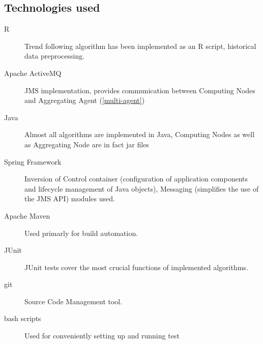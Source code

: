 \subsection{Technologies used}

\begin{description}
  \item [R]
      Trend following algorithm has been implemented as an R script, historical data preprocessing.
  \item [Apache ActiveMQ]
      JMS implementation, provides communication between Computing Nodes and Aggregating Agent (\ref{multi-agent})
  \item [Java]
      Almost all algorithms are implemented in Java, Computing Nodes as well as Aggregating Node are in fact jar files 
  \item [Spring Framework]
      Inversion of Control container (configuration of application components and lifecycle management of Java objects), Messaging (simplifies the use of the JMS API) modules used.
  \item [Apache Maven]
      Used primarly for build automation.
  \item [JUnit]
      JUnit tests cover the most crucial functions of implemented algorithms.
  \item [git]
      Source Code Management tool.
  \item [bash scripts]
      Used for conveniently setting up and running test 
\end{description}

 
